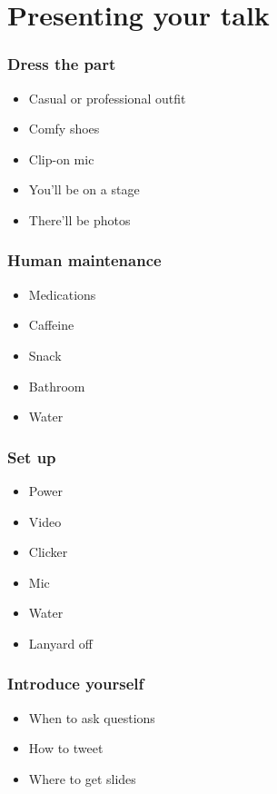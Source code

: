 \documentclass{beamer}
\begin{document}
\section{Presenting your talk}

\begin{frame}[fragile]
\tableofcontents[currentsection]
\end{frame}
\begin{frame}[fragile]
\frametitle{Dress the part}
\begin{itemize}[<+(1)->]
\item Casual or professional outfit
\item Comfy shoes
\item Clip-on mic
\item You'll be on a stage
\item There'll be photos
\end{itemize}
\end{frame}

\begin{frame}[fragile]
\frametitle{Human maintenance}
\begin{itemize}[<+(1)->]
\item Medications
\item Caffeine
\item Snack
\item Bathroom
\item Water
\end{itemize}
\end{frame}

\begin{frame}[fragile]
\frametitle{Set up}
\begin{itemize}[<+(1)->]
\item Power
\item Video
\item Clicker
\item Mic
\item Water
\item Lanyard off
\end{itemize}
\end{frame}

\begin{frame}[fragile]
\frametitle{Introduce yourself}
\begin{itemize}[<+(1)->]
\item When to ask questions
\item How to tweet
\item Where to get slides
\end{itemize}
\end{frame}
\end{document}

